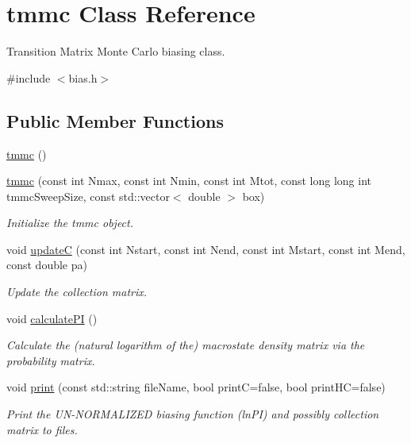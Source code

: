 \hypertarget{classtmmc}{\section{tmmc Class Reference}
\label{classtmmc}
}


Transition Matrix Monte Carlo biasing class.  




{\ttfamily \#include $<$bias.\-h$>$}

\subsection*{Public Member Functions}
\begin{DoxyCompactItemize}
\item 
\hyperlink{classtmmc_a2dd6a666daae3a9b7c3978d8ecff887e}{tmmc} ()
\item 
\hyperlink{classtmmc_ae09ec510cf4ba97b612fa0b42b811d20}{tmmc} (const int Nmax, const int Nmin, const int Mtot, const long long int tmmc\-Sweep\-Size, const std\-::vector$<$ double $>$ box)
\begin{DoxyCompactList}\small\item\em Initialize the tmmc object. \end{DoxyCompactList}\item 
void \hyperlink{classtmmc_ae067afc5b52af203b9d45f18d9737219}{update\-C} (const int Nstart, const int Nend, const int Mstart, const int Mend, const double pa)
\begin{DoxyCompactList}\small\item\em Update the collection matrix. \end{DoxyCompactList}\item 
void \hyperlink{classtmmc_a8e065523e9cc3c9628f91d3804cd201e}{calculate\-P\-I} ()
\begin{DoxyCompactList}\small\item\em Calculate the (natural logarithm of the) macrostate density matrix via the probability matrix. \end{DoxyCompactList}\item 
void \hyperlink{classtmmc_ad49e147dc88b3e1c2975269598f94327}{print} (const std\-::string file\-Name, bool print\-C=false, bool print\-H\-C=false)
\begin{DoxyCompactList}\small\item\em Print the U\-N-\/\-N\-O\-R\-M\-A\-L\-I\-Z\-E\-D biasing function (ln\-P\-I) and possibly collection matrix to files. \end{DoxyCompactList}\item 

\end{DoxyCompactItemize}
